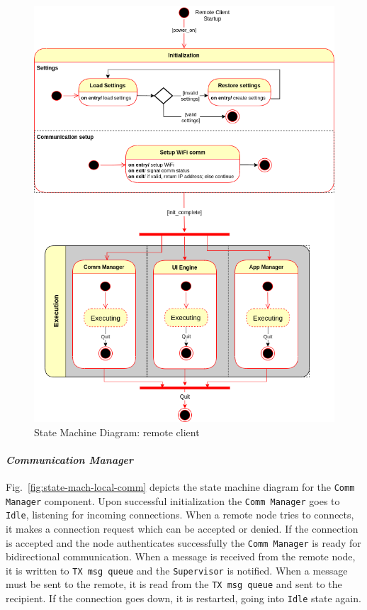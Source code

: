 %
\begin{figure}[htb!]
\centering
    \includegraphics[width=0.9\columnwidth]{./img/state-mach-rc.png}
  \caption{State Machine Diagram: remote client}%
\label{fig:state-mach-rc}
\end{figure}
%

\paragraph{\emph{Communication Manager}}
Fig.~\ref{fig:state-mach-local-comm} depicts the state machine diagram for the
\texttt{Comm Manager} component. Upon successful initialization the
\texttt{Comm Manager} goes to \texttt{Idle}, listening for incoming
connections. When a remote node tries to connects, it makes a connection request
which can be accepted or denied. If the connection is accepted and the node
authenticates successfully the \texttt{Comm Manager} is ready for bidirectional
communication. When a message is received from the remote node, it is written to
\texttt{TX msg queue} and the \texttt{Supervisor} is notified. When a message
must be sent to the remote, it is read from the \texttt{TX msg queue} and sent
to the recipient. If the connection goes down, it is restarted, going into
\texttt{Idle} state again.

